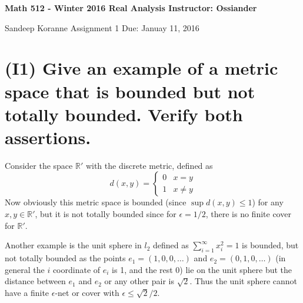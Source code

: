 \documentclass{article}
\def\le{\leqslant}
\def\RR{\mathbb R}
\begin{document}
\thispagestyle{empty}

\textbf{Math 512 - Winter 2016 \hfill Real Analysis  \hfill Instructor: Ossiander}

\hrulefill 
\medskip 

 {Sandeep Koranne \hfill Assignment 1 \hfill Due: Januay 11, 2016}
\medskip

\section*{(I1)  Give an example of a metric space that is bounded but not totally bounded.  Verify both assertions.}
Consider the space $\RR'$ with the discrete metric, defined as
\[
d(x,y) = \begin{cases} 
0 & x=y \\
1 & x\ne y
\end{cases}
\]
Now obviously this metric space is bounded (since $\sup d(x,y)\le 1$) 
for any $x,y \in \RR'$, but it is not totally bounded since for
$\epsilon=1/2$, there is no finite cover for $\RR'$.

Another example is the unit sphere in $l_2$ defined as
$\sum_{i=1}^\infty x_i^2 = 1$
is bounded, but not totally bounded as the points
$e_1=(1,0,0,\ldots)$ and $e_2=(0,1,0,\ldots)$ (in general
the $i$ coordinate of $e_i$ is 1, and the rest 0) lie on the unit
sphere but the distance between $e_1$ and $e_2$ or any other 
pair is $\sqrt{2}$. Thus the unit sphere cannot have a finite
$\epsilon$-net or cover with $\epsilon \le \sqrt{2}/2$.
\end{document}
